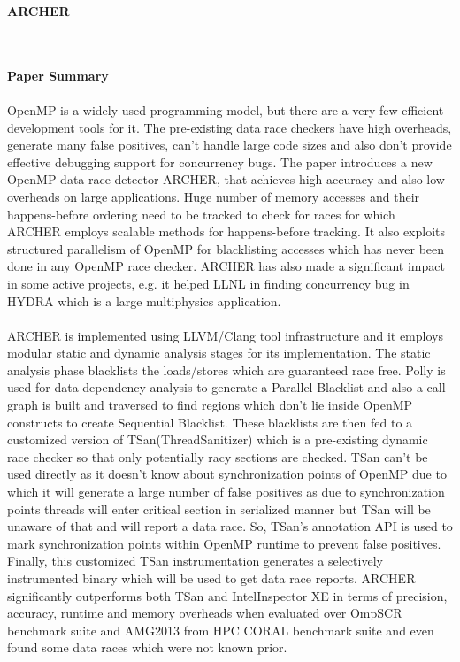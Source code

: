 \documentclass[20pt]{letter}
\begin{document}
\begin{enumerate}
{ \Large
\item
\begin{center}
    \textbf{ARCHER}
\end{center}
}
{ \fontsize{13}{13}\selectfont\\

\textbf{\\Paper Summary}\\\\
OpenMP is a widely used programming model, but there are a very few efficient development tools for it. The pre-existing data race checkers have high overheads, generate many false positives, can't handle large code sizes and also don't provide effective debugging support for concurrency bugs. The paper introduces a new OpenMP data race detector ARCHER, that achieves high accuracy and also low overheads on large applications. Huge number of memory accesses and their happens-before ordering need to be tracked to check for races for which ARCHER employs scalable methods for happens-before tracking. It also exploits structured parallelism of OpenMP for blacklisting accesses which has never been done in any OpenMP race checker. ARCHER has also made a significant impact in some active projects, e.g. it helped LLNL in finding concurrency bug in HYDRA which is a large multiphysics application.\\\\
ARCHER is implemented using LLVM/Clang tool infrastructure and it employs modular static and dynamic analysis stages for its implementation. The static analysis phase blacklists the loads/stores which are guaranteed race free. Polly is used for data dependency analysis to generate a Parallel Blacklist and also a call graph is built and traversed to find regions which don't lie inside OpenMP constructs to create Sequential Blacklist. These blacklists are then fed to a customized version of TSan(ThreadSanitizer) which is a pre-existing dynamic race checker so that only potentially racy sections are checked. TSan can't be used directly as it doesn't know about synchronization points of OpenMP due to which it will generate a large number of false positives as due to synchronization points threads will enter critical section in serialized manner but TSan will be unaware of that and will report a data race. So, TSan's annotation API is used to mark synchronization points within OpenMP runtime to prevent false positives. Finally, this customized TSan instrumentation generates a selectively instrumented binary which will be used to get data race reports. ARCHER significantly outperforms both TSan and Intel\textregistered Inspector XE in terms of precision, accuracy, runtime and memory overheads when evaluated over OmpSCR benchmark suite and AMG2013 from HPC CORAL benchmark suite and even found some data races which were not known prior.

}
\end{enumerate}
\end{document}
